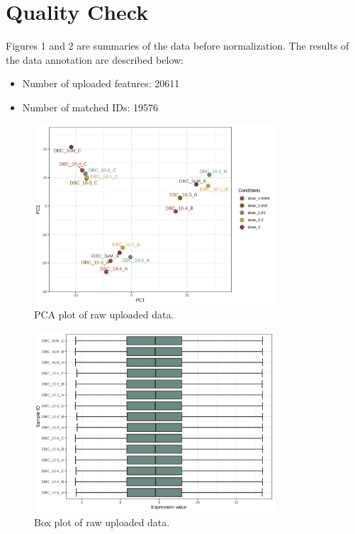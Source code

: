\documentclass[a4paper]{article}
\begin{document}
\section{Quality Check}
 Figures 1 and 2 are summaries of the data before normalization. The results of the  data annotation are described below:  \begin{itemize} \item{Number of uploaded features:  20611 } \item{Number of matched IDs:  19576 } \end{itemize} 

\begin{figure}[htp]
\begin{center}
\includegraphics[width=0.8\textwidth]{qc_pca_0dpi72.png}
\caption{
PCA plot of raw uploaded data.
}
\end{center}
\label{qc_pca_0dpi72.png}
\end{figure}
\begin{figure}[htp]
\begin{center}
\includegraphics[width=0.8\textwidth]{qc_boxplot_0dpi72.png}
\caption{
Box plot of raw uploaded data.
}
\end{center}
\label{qc_boxplot_0dpi72.png}
\end{figure}
\end{document}
